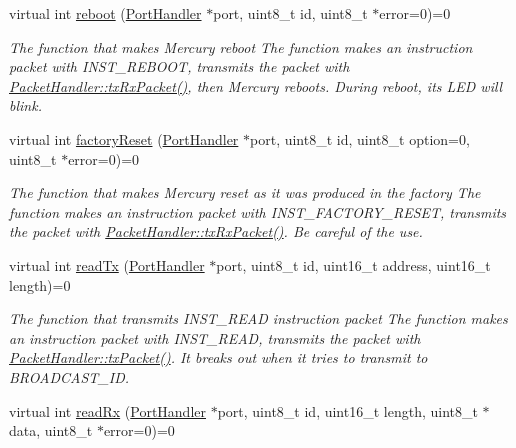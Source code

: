 \begin{DoxyCompactItemize}
virtual int \hyperlink{classmercury_1_1_packet_handler_a3ef14097ca9a667b90660edb72c61427}{reboot} (\hyperlink{classmercury_1_1_port_handler}{Port\+Handler} $\ast$port, uint8\+\_\+t id, uint8\+\_\+t $\ast$error=0)=0
\begin{DoxyCompactList}\small\item\em The function that makes Mercury reboot  The function makes an instruction packet with I\+N\+S\+T\+\_\+\+R\+E\+B\+O\+OT,  transmits the packet with \hyperlink{classmercury_1_1_packet_handler_ac7ceeaec210827d119199144badaad3a}{Packet\+Handler\+::tx\+Rx\+Packet()},  then Mercury reboots.  During reboot, its L\+ED will blink. \end{DoxyCompactList}\item 
virtual int \hyperlink{classmercury_1_1_packet_handler_a03067ed71a4267c2b4fd3c21e63884f2}{factory\+Reset} (\hyperlink{classmercury_1_1_port_handler}{Port\+Handler} $\ast$port, uint8\+\_\+t id, uint8\+\_\+t option=0, uint8\+\_\+t $\ast$error=0)=0
\begin{DoxyCompactList}\small\item\em The function that makes Mercury reset as it was produced in the factory  The function makes an instruction packet with I\+N\+S\+T\+\_\+\+F\+A\+C\+T\+O\+R\+Y\+\_\+\+R\+E\+S\+ET,  transmits the packet with \hyperlink{classmercury_1_1_packet_handler_ac7ceeaec210827d119199144badaad3a}{Packet\+Handler\+::tx\+Rx\+Packet()}.  Be careful of the use. \end{DoxyCompactList}\item 
virtual int \hyperlink{classmercury_1_1_packet_handler_a58220a79dcdff959241bd5688e6dbb1a}{read\+Tx} (\hyperlink{classmercury_1_1_port_handler}{Port\+Handler} $\ast$port, uint8\+\_\+t id, uint16\+\_\+t address, uint16\+\_\+t length)=0
\begin{DoxyCompactList}\small\item\em The function that transmits I\+N\+S\+T\+\_\+\+R\+E\+AD instruction packet  The function makes an instruction packet with I\+N\+S\+T\+\_\+\+R\+E\+AD,  transmits the packet with \hyperlink{classmercury_1_1_packet_handler_acc3f84f0d952dc2d827d8500de512abe}{Packet\+Handler\+::tx\+Packet()}.  It breaks out  when it tries to transmit to B\+R\+O\+A\+D\+C\+A\+S\+T\+\_\+\+ID. \end{DoxyCompactList}\item 
virtual int \hyperlink{classmercury_1_1_packet_handler_a0857bd487c48ea83fc2b93e1e3e80200}{read\+Rx} (\hyperlink{classmercury_1_1_port_handler}{Port\+Handler} $\ast$port, uint8\+\_\+t id, uint16\+\_\+t length, uint8\+\_\+t $\ast$data, uint8\+\_\+t $\ast$error=0)=0

\end{DoxyCompactItemize}
